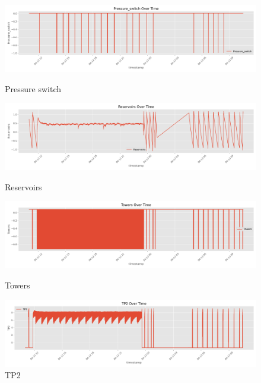 \documentclass[12pt,letterpaper]{article}
\begin{document}
\begin{figure}[htp]
    \centering
    \begin{minipage}[b]{0.45\textwidth}
        \centering
        \includegraphics[width=\textwidth]{Pressure_switch.png}
        \caption*{Pressure switch}
    \end{minipage}
    \hfill
    \begin{minipage}[b]{0.45\textwidth}
        \centering
        \includegraphics[width=\textwidth]{Reservoirs.png}
        \caption*{Reservoirs}
    \end{minipage}
    \vspace{0.5em}

    \begin{minipage}[b]{0.45\textwidth}
        \centering
        \includegraphics[width=\textwidth]{Towers.png}
        \caption*{Towers}
    \end{minipage}
    \hfill
    \begin{minipage}[b]{0.45\textwidth}
        \centering
        \includegraphics[width=\textwidth]{TP2.png}
        \caption*{TP2}
    \end{minipage}
    \vspace{0.5em}


\end{figure}
\end{document}
